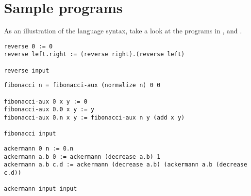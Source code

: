 \section{Sample programs}\label{section:d-samples}

As an illustration of the language syntax, take a look at the programs in
,  and
.

\begin{lstlisting}[label=listing:reverse,
  caption={A program that reverses the order of the nodes of some supplied tree.}]
reverse 0 := 0
reverse left.right := (reverse right).(reverse left)

reverse input
\end{lstlisting}

\begin{lstlisting}[label=listing:fibonacci,
  caption={A program that computes the $n^{th}$ fibonacci when supplied with some $n$.}] 
fibonacci n = fibonacci-aux (normalize n) 0 0

fibonacci-aux 0 x y := 0
fibonacci-aux 0.0 x y := y
fibonacci-aux 0.n x y := fibonacci-aux n y (add x y)

fibonacci input
\end{lstlisting}

\begin{lstlisting}[label=listing:ackermann,
  caption={The Ackermann-P\'eter function.}]
ackermann 0 n := 0.n
ackermann a.b 0 := ackermann (decrease a.b) 1
ackermann a.b c.d := ackermann (decrease a.b) (ackermann a.b (decrease c.d))

ackermann input input
\end{lstlisting}
